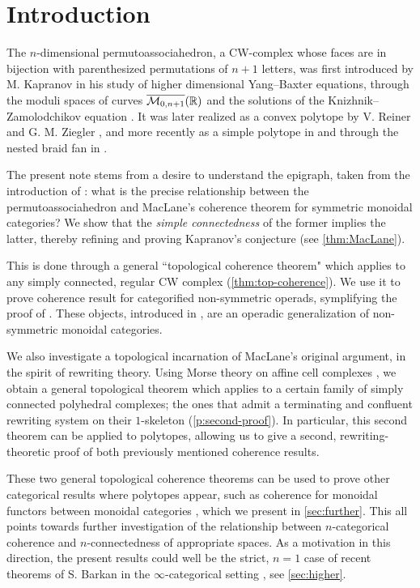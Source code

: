 
\section*{Introduction} 
\label{s:introduction}

The $n$-dimensional permutoassociahedron, a CW-complex whose faces are in bijection with parenthesized permutations of $n+1$ letters, was first introduced by M. Kapranov in his study of higher dimensional Yang--Baxter equations, through the moduli spaces of curves $\overline{\mathcal{M}_{0,n+1}}(\mathbb R)$ and the solutions of the Knizhnik--Zamolodchikov equation \cite{kapranov1993}.
It was later realized as a convex polytope by V. Reiner and G. M. Ziegler \cite{reinerCoxeterassociahedra1994}, and more recently as a simple polytope in \cite{baralicSimplePermutoassociahedron2019} and through the nested braid fan in \cite{CastilloLiu21}.

The present note stems from a desire to understand the epigraph, taken from the introduction of \cite{kapranov1993}: what is the precise relationship between the permutoassociahedron and MacLane's coherence theorem for symmetric monoidal categories? 
We show that the \emph{simple connectedness} of the former implies the latter, thereby refining and proving Kapranov's conjecture (see \cref{thm:MacLane}).

This is done through a general ``topological coherence theorem" which applies to any simply connected, regular CW complex (\cref{thm:top-coherence}).
We use it to prove coherence result for categorified non-symmetric operads, symplifying the proof of \cite{DP15}. 
These objects, introduced in \cite{DP15}, are an operadic generalization of non-symmetric monoidal categories. 

We also investigate a topological incarnation of MacLane's original argument, in the spirit of rewriting theory. 
Using Morse theory on affine cell complexes \cite{bestvinaMorseTheoryFiniteness1997}, we obtain a general topological theorem which applies to a certain family of simply connected polyhedral complexes; the ones that admit a terminating and confluent rewriting system on their $1$-skeleton (\cref{p:second-proof}). 
In particular, this second theorem can be applied to polytopes, allowing us to give a second, rewriting-theoretic proof of both previously mentioned coherence results. 

These two general topological coherence theorems can be used to prove other categorical results where polytopes appear, such as coherence for monoidal functors between monoidal categories \cite{epsteinFunctorsTensoredCategories1966}, which we present in \cref{sec:further}.
This all points towards further investigation of the relationship between $n$-categorical coherence and $n$-connectedness of appropriate spaces.
As a motivation in this direction, the present results could well be the strict, $n=1$ case of recent theorems of S. Barkan in the $\infty$-categorical setting \cite{barkanArityApproximationInfty2022}, see \cref{sec:higher}.

